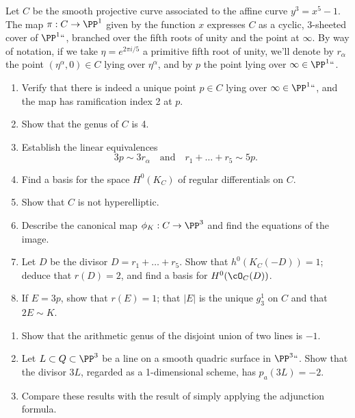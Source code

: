 \begin{exercise}
Let $C$ be the smooth projective curve associated to the affine curve
$y^3 = x^5 -1$. 
The map $\pi : C \to \PP^1$ given by the
function $x$ expresses $C$ as a cyclic, 3-sheeted cover of $\PP^1` `$,
branched over the fifth roots of unity and the point at $\infty$. By
way of notation, if we take $\eta = e^{2\pi i/5}$ a primitive fifth
root of unity, we'll denote by $r_\alpha$ the point $(\eta^\alpha, 0)
\in C$ lying over $\eta^\alpha$, and by $p$ the point lying over
$\infty \in \PP^1` `$.

\begin{enumerate}
\item Verify that there is indeed a unique point $p \in C$ lying over $\infty \in \PP^1` `$, and the map has ramification index 2 at $p$. 
\item Show that the genus of $C$ is 4.
\item Establish the linear equivalences
$$
3p \sim 3r_\alpha \quad \text{and} \quad r_1+ \dots + r_5 \sim 5p.
$$
\item Find a basis for the space $H^0(K_C)$ of regular differentials on $C$.
\item Show that $C$ is not hyperelliptic.
\item Describe the canonical map $\phi_K : C \to \PP^3$ and find the equations of the image.
\item Let $D$ be the divisor $D = r_1+\dots+r_5$. Show that $h^0(K_C(-D)) = 1$; deduce that $r(D) = 2$, and find a basis for $H^0(\cO_C(D))$.
\item If $E = 3p$, show that $r(E) = 1$; that $|E|$ is the unique $g^1_3$ on $C$ and that $2E \sim K$.
\end{enumerate}
\end{exercise}


\begin{exercise}\label{pa example}
\begin{enumerate}
 \item Show that the 
%
arithmetic genus
of the disjoint union of two lines is $-1$.
\item Let $L\subset Q\subset \PP^3$ be a line on a smooth quadric surface in $\PP^3` `$. Show that the 
divisor $3L$, regarded as a 1-dimensional scheme, has $p_a(3L) = -2$.
\item Compare these results with the result of simply applying the adjunction formula.
\end{enumerate}
\end{exercise}


